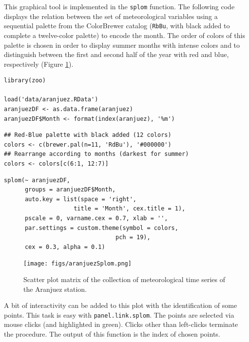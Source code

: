 \documentclass[smallroyalvopaper]{memoir}
\begin{document}
This graphical tool is implemented in the \texttt{splom} function. The
following code displays the relation between the set of
meteorological variables using a sequential palette from the
ColorBrewer catalog (\texttt{RbBu}, with black added to complete a
twelve-color palette) to encode the month. The order of colors of
this palette is chosen in order to display summer months with
intense colors and to distinguish between the first and second
half of the year with red and blue, respectively (Figure
\ref{fig:aranjuezSplom}).



\lstset{language=r,label= ,caption= ,captionpos=b,numbers=none}
\begin{lstlisting}
library(zoo)

load('data/aranjuez.RData')
aranjuezDF <- as.data.frame(aranjuez)
aranjuezDF$Month <- format(index(aranjuez), '%m')
\end{lstlisting}

\lstset{language=r,label= ,caption= ,captionpos=b,numbers=none}
\begin{lstlisting}
## Red-Blue palette with black added (12 colors)
colors <- c(brewer.pal(n=11, 'RdBu'), '#000000')
## Rearrange according to months (darkest for summer)
colors <- colors[c(6:1, 12:7)]
\end{lstlisting}

\lstset{language=r,label= ,caption= ,captionpos=b,numbers=none}
\begin{lstlisting}
splom(~ aranjuezDF, 
      groups = aranjuezDF$Month,
      auto.key = list(space = 'right', 
                    title = 'Month', cex.title = 1),
      pscale = 0, varname.cex = 0.7, xlab = '',
      par.settings = custom.theme(symbol = colors,
                                pch = 19),
      cex = 0.3, alpha = 0.1)
\end{lstlisting}

\begin{figure}[htbp]
\centering
\texttt{[image: figs/aranjuezSplom.png]}
\caption{Scatter plot matrix of the collection of meteorological time series of the Aranjuez station. \label{fig:aranjuezSplom}}
\end{figure}

A bit of interactivity can be added to this plot with the
identification of some points. This task is easy with
\texttt{panel.link.splom}. The points are selected via mouse clicks (and
highlighted in green). Clicks other than left-clicks terminate the
procedure. The output of this function is the index of chosen
points.
\end{document}
